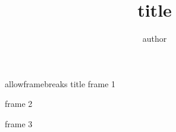 \documentclass[compress]{beamer}
\title{title}
\author{author}
\begin{document}
   

\begin{frame}[allowframebreaks]{allowframebreaks title}
    frame 1
    \framebreak

    frame 2
    \framebreak

    frame 3
    \framebreak
\end{frame}
\end{document}
